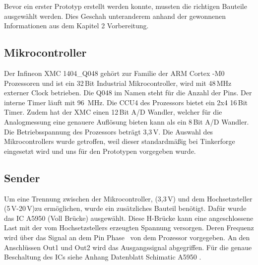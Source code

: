 Bevor ein erster Prototyp erstellt werden konnte, mussten die richtigen Bauteile ausgewählt werden. Dies Geschah unteranderem anhand der gewonnenen Informationen aus dem Kapitel 2 Vorbereitung. 

\subsection{Mikrocontroller}
Der Infineon XMC 1404\_Q048 gehört zur Familie der ARM Cortex -M0 Prozessoren und ist ein 32\,Bit Industrial Mikrocontroller, wird mit 48\,MHz externer Clock betrieben. Die Q048 im Namen steht für die Anzahl der Pins. Der interne Timer läuft mit 96~MHz. Die CCU4 des Prozessors bietet ein 2x4 16\,Bit Timer. Zudem hat der XMC einen 12\,Bit A/D Wandler, welcher für die Analogmessung eine genauere Auflösung bieten kann als ein 8\,Bit A/D Wandler. Die Betriebsspannung des Prozessors beträgt 3,3\,V. Die Auswahl des Mikrocontrollers wurde getroffen, weil dieser standardmäßig bei Tinkerforge eingesetzt wird und uns für den Prototypen vorgegeben wurde.


\subsection{Sender}Um eine Trennung zwischen der Mikrocontroller, (3,3\,V) und dem Hochsetzsteller (5\,V-20\,V)zu ermöglichen, wurde ein zusätzliches Bauteil benötigt. Dafür wurde das IC A5950 (Voll Brücke) ausgewählt. Diese H-Brücke kann eine angeschlossene Last mit der vom Hochsetzstellers erzeugten Spannung versorgen. Deren Frequenz wird über das Signal an dem Pin \glqq Phase \grqq~von dem Prozessor vorgegeben. An den Anschlüssen Out1 und Out2 wird das Ausgangssignal abgegriffen. Für die genaue Beschaltung des ICs siehe Anhang Datenblatt  \glqq Schimatic A5950 \grqq.




